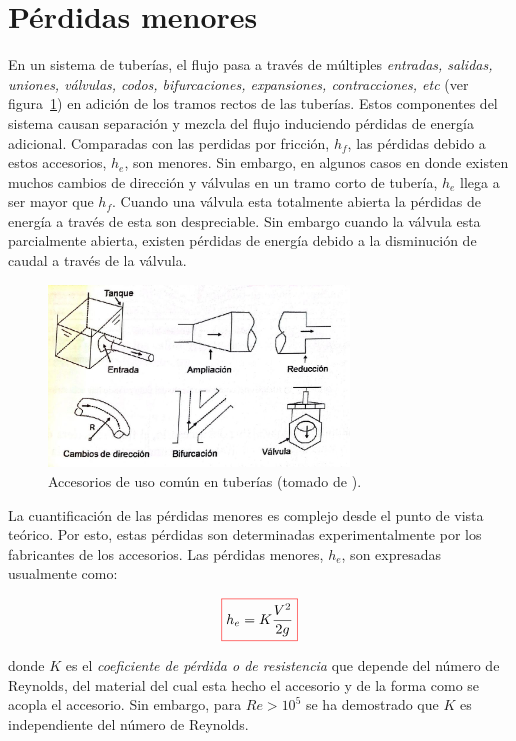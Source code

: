 \documentclass[11pt, oneside]{article}
\begin{document}
\section{P\'erdidas menores} %
En un sistema de tuber\'ias, el flujo pasa a trav\'es de m\'ultiples \emph{entradas, salidas, uniones, v\'alvulas, codos, bifurcaciones, expansiones, contracciones, etc} (ver figura~\ref{acce}) en adici\'on de los tramos rectos de las tuber\'ias. Estos componentes del sistema causan separaci\'on y mezcla del flujo induciendo p\'erdidas de energ\'ia adicional. Comparadas con las perdidas por fricci\'on, $h_f$, las p\'erdidas debido a estos accesorios, $h_e$, son menores. Sin embargo, en algunos casos en donde existen muchos cambios de direcci\'on y v\'alvulas en un tramo corto de tuber\'ia,  $h_e$ llega a ser mayor que $h_f$. Cuando una v\'alvula esta totalmente abierta la p\'erdidas de energ\'ia a trav\'es de esta son despreciable. Sin embargo cuando la v\'alvula esta parcialmente abierta, existen p\'erdidas de energ\'ia debido a la disminuci\'on de caudal a trav\'es de la v\'alvula. 


\begin{figure}[h]
\centering
\includegraphics[width=8cm]{acce.jpeg}
\caption{Accesorios de uso com\'un en tuber\'ias (tomado de \cite{agudelo2011mecanica}).}
\label{acce}
\end{figure}

La cuantificaci\'on de las p\'erdidas menores es complejo desde el punto de vista te\'orico. Por esto, estas p\'erdidas son determinadas experimentalmente por los fabricantes de los accesorios. Las p\'erdidas menores, $h_e$, son expresadas usualmente como:

\begin{equation}
\color{red}\boxed{\color{black} h_e = K \frac{V^2}{2g} }
\label{perm0}
\end{equation}

donde $K$ es el \emph{coeficiente de p\'erdida o de resistencia} que depende del n\'umero de Reynolds, del material del cual esta hecho el accesorio y de la forma como se acopla el accesorio. Sin embargo, para $Re > 10^5$ se ha demostrado que $K$ es independiente del n\'umero de Reynolds.
\end{document}
